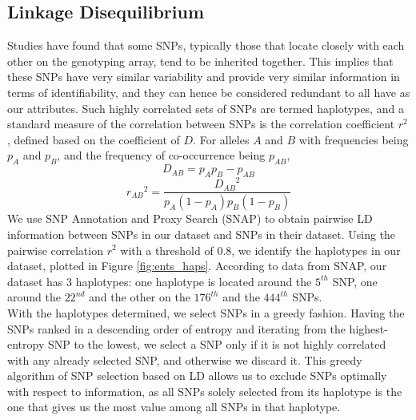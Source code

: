 \documentclass[14pt, oneside]{article}   	%
\begin{document}
\subsection{Linkage Disequilibrium}\label{sec:ld}
Studies have found that some SNPs, %
typically those that locate closely with each other on the genotyping array, tend to be inherited together.
This implies that these SNPs have very similar variability and provide very similar information in terms of identifiability,
and they can hence be considered redundant to all have as our attributes.
Such highly correlated sets of SNPs are termed haplotypes,
and a standard measure of the correlation between SNPs is the correlation coefficient $r^2$,
defined based on the coefficient of $D$.
For alleles $A$ and $B$ with frequencies being $p_A$ and $p_B$, and the frequency of co-occurrence being $p_{AB}$,
\[
D_{AB} = p_A p_B - p_{AB}
\]
\[
{r_{AB}}^2 = \frac{{D_{AB}}^2}{p_A(1-p_A)p_B(1-p_B)}
\]
We use SNP Annotation and Proxy Search (SNAP) \cite{johnson2008snap} to obtain pairwise LD information between SNPs in our dataset and SNPs in their dataset.
Using the pairwise correlation $r^2$ with a threshold of $0.8$, we identify the haplotypes in our dataset, plotted in Figure \ref{fig:ents_haps}.
According to data from SNAP, our dataset has 3 haplotypes:
one haplotype is located around the $5^{th}$ SNP, one around the $22^{nd}$ and the other on the $176^{th}$ and the $444^{th}$ SNPs.
\\
With the haplotypes determined, we select SNPs in a greedy fashion.
Having the SNPs ranked in a descending order of entropy 
and iterating from the highest-entropy SNP to the lowest,
we select a SNP only if it is not highly correlated with any already selected SNP,
and otherwise we discard it.
This greedy algorithm of SNP selection based on LD allows us to exclude SNPs optimally with respect to information,
as all SNPs solely selected from its haplotype is the one that gives us the most value among all SNPs in that haplotype.
%
%
%
%
%
%
%
%
%
%
%
%
%
%
%
%
%
%
\end{document}
